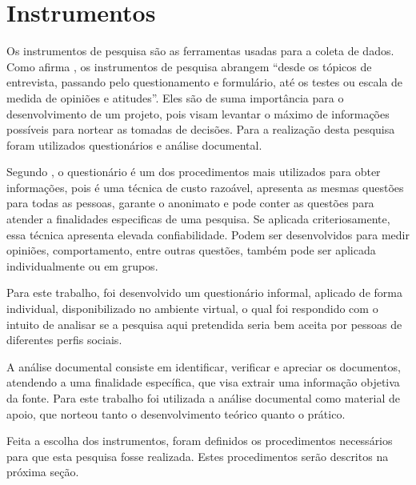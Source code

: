 \section{Instrumentos}

\par Os instrumentos de pesquisa são as ferramentas usadas para a coleta de dados. Como afirma , os instrumentos de pesquisa abrangem “desde os tópicos de entrevista, passando pelo questionamento e formulário, até os testes ou escala de medida de opiniões e atitudes”. Eles são de suma importância para o desenvolvimento de um projeto, pois visam levantar o máximo de informações possíveis para nortear as tomadas de decisões. Para a realização desta pesquisa foram utilizados questionários e análise documental.

\par Segundo , o questionário é um dos procedimentos mais utilizados para obter informações, pois é uma técnica de custo razoável, apresenta as mesmas questões para todas as pessoas, garante o anonimato e pode conter as questões para atender a finalidades especificas de uma pesquisa. Se aplicada criteriosamente, essa técnica apresenta elevada confiabilidade. Podem ser desenvolvidos para medir opiniões, comportamento, entre outras questões, também pode ser aplicada individualmente ou em grupos.

\par Para este trabalho, foi desenvolvido um questionário informal, aplicado de forma individual, disponibilizado no ambiente virtual, o qual foi respondido com o intuito de analisar se a pesquisa aqui pretendida seria bem aceita por pessoas de diferentes perfis sociais. %


\par A análise documental consiste em identificar, verificar e apreciar os documentos, atendendo a uma finalidade específica, que visa extrair uma informação objetiva da fonte. Para este trabalho foi utilizada a análise documental como material de apoio, que norteou tanto o desenvolvimento teórico quanto o prático.

\par Feita a escolha dos instrumentos, foram definidos os procedimentos necessários para que esta pesquisa fosse realizada. Estes procedimentos serão descritos na próxima seção.



